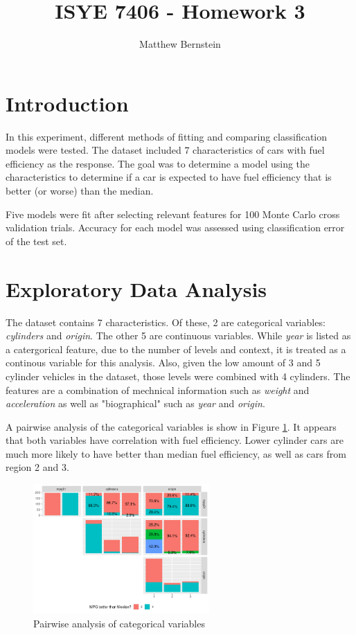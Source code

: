 \documentclass[12pt,letterpaper]{article}
\title{ISYE 7406 - Homework 3}
\author{Matthew Bernstein}
\begin{document}
\maketitle
\section*{Introduction}

In this experiment, different methods of fitting and comparing classification models were tested. The dataset included 7 characteristics of cars with fuel efficiency as the response. The goal was to determine a model using the characteristics to determine if a car is expected to have fuel efficiency that is better (or worse) than the median.

Five models were fit after selecting relevant features for 100 Monte Carlo cross validation trials. Accuracy for each model was assessed using classification error of the test set. 

\section*{Exploratory Data Analysis}

The dataset contains 7 characteristics. Of these, 2 are categorical variables: \textit{cylinders} and \textit{origin}. The other 5 are continuous variables. While \textit{year} is listed as a catergorical feature, due to the number of levels and context, it is treated as a continous variable for this analysis. Also, given the low amount of 3 and 5 cylinder vehicles in the dataset, those levels were combined with 4 cylinders. The features are a combination of mechnical information such as \textit{weight} and \textit{acceleration} as well as "biographical" such as \textit{year} and \textit{origin}. 

A pairwise analysis of the categorical variables is show in Figure \ref{fig:cat_vars}. It appears that both variables have correlation with fuel efficiency. Lower cylinder cars are much more likely to have better than median fuel efficiency, as well as cars from region 2 and 3. 

\begin{figure}[!htb]
  \centering
  \includegraphics[width=0.6\textwidth]{disc_pairs}
  \caption{Pairwise analysis of categorical variables}
  \label{fig:cat_vars}
\end{figure}
\end{document}
